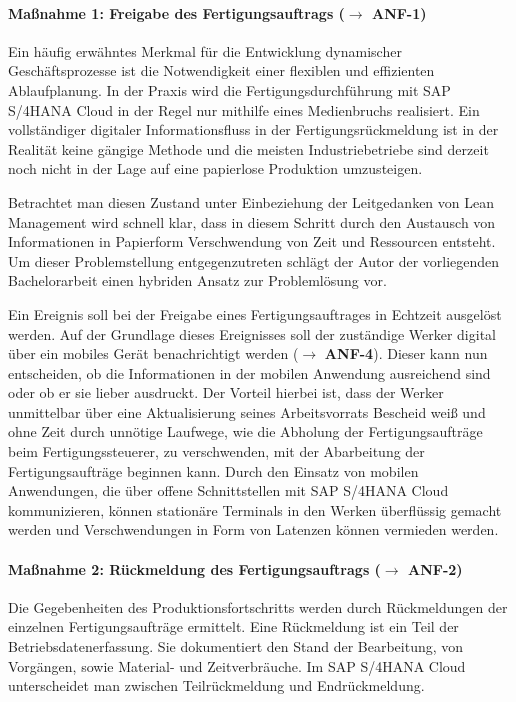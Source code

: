 \paragraph{Maßnahme 1: Freigabe des Fertigungsauftrags ($\rightarrow$ \textbf{ANF-1})}
Ein häufig erwähntes Merkmal für die Entwicklung dynamischer Geschäftsprozesse ist die Notwendigkeit einer flexiblen und effizienten Ablaufplanung. In der Praxis wird die Fertigungsdurchführung mit SAP S/4HANA Cloud in der Regel nur mithilfe eines Medienbruchs realisiert. Ein vollständiger digitaler Informationsfluss in der Fertigungsrückmeldung ist in der Realität keine gängige Methode und die meisten Industriebetriebe sind derzeit noch nicht in der Lage auf eine papierlose Produktion umzusteigen.

Betrachtet man diesen Zustand unter Einbeziehung der Leitgedanken von Lean Management wird schnell klar, dass in diesem Schritt durch den Austausch von Informationen in Papierform Verschwendung von Zeit und Ressourcen entsteht. Um dieser Problemstellung entgegenzutreten schlägt der Autor der vorliegenden Bachelorarbeit einen hybriden Ansatz zur Problemlösung vor.

Ein Ereignis soll bei der Freigabe eines Fertigungsauftrages in Echtzeit ausgelöst werden. Auf der Grundlage dieses Ereignisses soll der zuständige Werker digital über ein mobiles Gerät benachrichtigt werden
($\rightarrow$ \textbf{ANF-4}).
Dieser kann nun entscheiden, ob die Informationen in der mobilen Anwendung ausreichend sind oder ob er sie lieber ausdruckt. Der Vorteil hierbei ist, dass der Werker unmittelbar über eine Aktualisierung seines Arbeitsvorrats Bescheid weiß und ohne Zeit durch unnötige Laufwege, wie die Abholung der Fertigungsaufträge beim Fertigungssteuerer, zu verschwenden, mit der Abarbeitung der Fertigungsaufträge beginnen kann. Durch den Einsatz von mobilen Anwendungen, die über offene Schnittstellen mit SAP S/4HANA Cloud kommunizieren, können stationäre Terminals in den Werken überflüssig gemacht werden und Verschwendungen in Form von Latenzen können vermieden werden.

\paragraph{Maßnahme 2: Rückmeldung des Fertigungsauftrags ($\rightarrow$ \textbf{ANF-2})}
Die Gegebenheiten des Produktionsfortschritts werden durch Rückmeldungen der einzelnen Fertigungsaufträge ermittelt. Eine Rückmeldung ist ein Teil der Betriebsdatenerfassung. Sie dokumentiert den Stand der Bearbeitung, von Vorgängen, sowie Material- und Zeitverbräuche. Im SAP S/4HANA Cloud unterscheidet man zwischen Teilrückmeldung und Endrückmeldung. 

